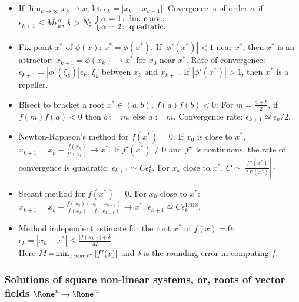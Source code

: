 \documentclass[a4paper]{article}
\begin{document}
\begin{itemize}
  \item If $\lim_{k\to\infty}x_k\to x$,
    let $\epsilon_k=|x_k-x_{k-1}|$.
    Covergence is of order $\alpha$ if
    $
    \epsilon_{k+1}\le M\epsilon_k^\alpha
    $,
    $k>N$;
    $
    \Bigl\{\mkern-6mu
    \begin{array}{l}
      \alpha=1\!:~\text{lin.~conv.}, \\[-2pt]
      \alpha=2\!:~\text{quadratic}. \\
    \end{array}
    \Bigr.
    $

  \item Fix point $x^*$ of $\phi(x)$:
    $x^*=\phi(x^*)$.
    If $|\phi'(x^*)|<1$ near $x^*$, then
    $x^*$ is an attractor:
    $x_{k+1}=\phi(x_k)\to x^*$
    for $x_0$ near $x^*$.
    Rate of convergence: $\epsilon_{k+1}=|\phi'(\xi_k)|\epsilon_k$,
    $\xi_k$ between $x_k$ and $x_{k+1}$.
    If $|\phi'(x^*)|>1$, then $x^*$ is a repeller.

  \item Bisect to bracket a root $x^*\in(a,b)$, $f(a)f(b)<0$:
     For $m=\frac{a+b}{2}$, if $f(m)f(a)<0$ then $b:=m$, else $a:=m$.
     Convergence rate: $\epsilon_{k+1}\simeq \epsilon_k/2$.


  \item Newton-Raphson's method for $f(x^*)=0$: If $x_0$ is close to $x^*$,
    $x_{k+1}=x_k - \frac{f(x_k)}{f'(x_k)}\to x^*$.
    If $f'(x^*)\neq0$ and $f''$ is continuous, the rate of convergence is quadratic:
     $\epsilon_{k+1}\simeq C\epsilon_k^2$. For $x_k$ close to $x^*$,
     $C\simeq |\frac{f''(x^*)}{2f'(x^*)}|\cdot$

  \item Secant method for $f(x^*)=0$. For $x_0$ close to $x^*$:
    $x_{k+1}=x_k - \frac{f(x_k)(x_k-x_{k-1})}{f(x_k)-f(x_{k-1})}\to x^*$,
     $\epsilon_{k+1}\simeq C\epsilon_k^{1.618}.$

  \item Method independent estimate for the root $x^*$ of $f(x)=0$:
    $\epsilon_k=|x_k-x^*|\le \frac{|f(x_k)|+\delta}{M}$. \\
    Here
    $M\!=\!\min_{x\,\mbox{\tiny near}\,x^*}|f'(x)|$ and $\delta$
    is the rounding error in computing $f$.

\end{itemize}

\subsubsection*{Solutions of square non-linear systems, or, roots of vector fields $\Rone^n\to\Rone^n$}%
\end{document}
